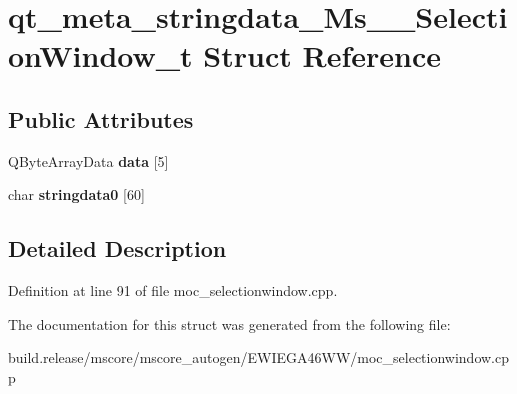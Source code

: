 \hypertarget{structqt__meta__stringdata___ms_____selection_window__t}{}\section{qt\+\_\+meta\+\_\+stringdata\+\_\+\+Ms\+\_\+\+\_\+\+Selection\+Window\+\_\+t Struct Reference}
\label{structqt__meta__stringdata___ms_____selection_window__t}
\subsection*{Public Attributes}
\begin{DoxyCompactItemize}
\item 
\mbox{\label{structqt__meta__stringdata___ms_____selection_window__t_a454794b05500f913d24a7921d056ff3f}} 
Q\+Byte\+Array\+Data {\bfseries data} \mbox{[}5\mbox{]}
\item 
\mbox{\label{structqt__meta__stringdata___ms_____selection_window__t_ab081b2e9e6a7a7844767ed583545aefe}} 
char {\bfseries stringdata0} \mbox{[}60\mbox{]}
\end{DoxyCompactItemize}


\subsection{Detailed Description}


Definition at line 91 of file moc\+\_\+selectionwindow.\+cpp.



The documentation for this struct was generated from the following file\+:\begin{DoxyCompactItemize}
\item 
build.\+release/mscore/mscore\+\_\+autogen/\+E\+W\+I\+E\+G\+A46\+W\+W/moc\+\_\+selectionwindow.\+cpp\end{DoxyCompactItemize}

